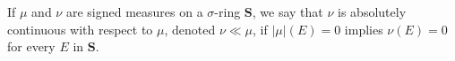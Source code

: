 If $\mu$ and $\nu$ are signed measures on a $\sigma$-ring $\mathbf{S}$, we say that $\nu$ is absolutely continuous with respect to $\mu$, denoted $\nu \ll \mu$, if $|\mu|(E) = 0$ implies $\nu(E) = 0$ for every $E$ in $\mathbf{S}$.

